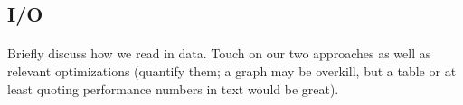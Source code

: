 \subsection{I/O}
\label{sec:deep:io}

\paragraph{}
Briefly discuss how we read in data. Touch on our two approaches as well as
relevant optimizations (quantify them; a graph may be overkill, but a table or
at least quoting performance numbers in text would be great).
